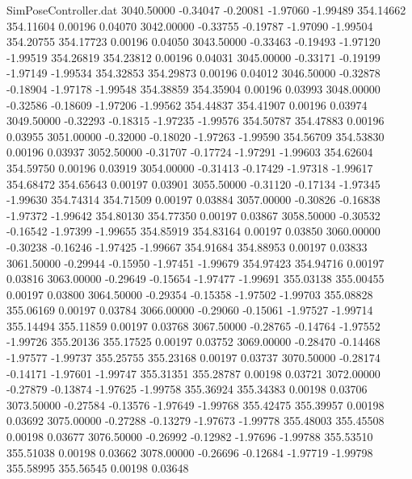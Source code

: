 \begin{filecontents}{SimPoseController.dat}
3040.50000   -0.34047   -0.20081    -1.97060   -1.99489  354.14662  354.11604    0.00196    0.04070
3042.00000   -0.33755   -0.19787    -1.97090   -1.99504  354.20755  354.17723    0.00196    0.04050
3043.50000   -0.33463   -0.19493    -1.97120   -1.99519  354.26819  354.23812    0.00196    0.04031
3045.00000   -0.33171   -0.19199    -1.97149   -1.99534  354.32853  354.29873    0.00196    0.04012
3046.50000   -0.32878   -0.18904    -1.97178   -1.99548  354.38859  354.35904    0.00196    0.03993
3048.00000   -0.32586   -0.18609    -1.97206   -1.99562  354.44837  354.41907    0.00196    0.03974
3049.50000   -0.32293   -0.18315    -1.97235   -1.99576  354.50787  354.47883    0.00196    0.03955
3051.00000   -0.32000   -0.18020    -1.97263   -1.99590  354.56709  354.53830    0.00196    0.03937
3052.50000   -0.31707   -0.17724    -1.97291   -1.99603  354.62604  354.59750    0.00196    0.03919
3054.00000   -0.31413   -0.17429    -1.97318   -1.99617  354.68472  354.65643    0.00197    0.03901
3055.50000   -0.31120   -0.17134    -1.97345   -1.99630  354.74314  354.71509    0.00197    0.03884
3057.00000   -0.30826   -0.16838    -1.97372   -1.99642  354.80130  354.77350    0.00197    0.03867
3058.50000   -0.30532   -0.16542    -1.97399   -1.99655  354.85919  354.83164    0.00197    0.03850
3060.00000   -0.30238   -0.16246    -1.97425   -1.99667  354.91684  354.88953    0.00197    0.03833
3061.50000   -0.29944   -0.15950    -1.97451   -1.99679  354.97423  354.94716    0.00197    0.03816
3063.00000   -0.29649   -0.15654    -1.97477   -1.99691  355.03138  355.00455    0.00197    0.03800
3064.50000   -0.29354   -0.15358    -1.97502   -1.99703  355.08828  355.06169    0.00197    0.03784
3066.00000   -0.29060   -0.15061    -1.97527   -1.99714  355.14494  355.11859    0.00197    0.03768
3067.50000   -0.28765   -0.14764    -1.97552   -1.99726  355.20136  355.17525    0.00197    0.03752
3069.00000   -0.28470   -0.14468    -1.97577   -1.99737  355.25755  355.23168    0.00197    0.03737
3070.50000   -0.28174   -0.14171    -1.97601   -1.99747  355.31351  355.28787    0.00198    0.03721
3072.00000   -0.27879   -0.13874    -1.97625   -1.99758  355.36924  355.34383    0.00198    0.03706
3073.50000   -0.27584   -0.13576    -1.97649   -1.99768  355.42475  355.39957    0.00198    0.03692
3075.00000   -0.27288   -0.13279    -1.97673   -1.99778  355.48003  355.45508    0.00198    0.03677
3076.50000   -0.26992   -0.12982    -1.97696   -1.99788  355.53510  355.51038    0.00198    0.03662
3078.00000   -0.26696   -0.12684    -1.97719   -1.99798  355.58995  355.56545    0.00198    0.03648

\end{filecontents}
